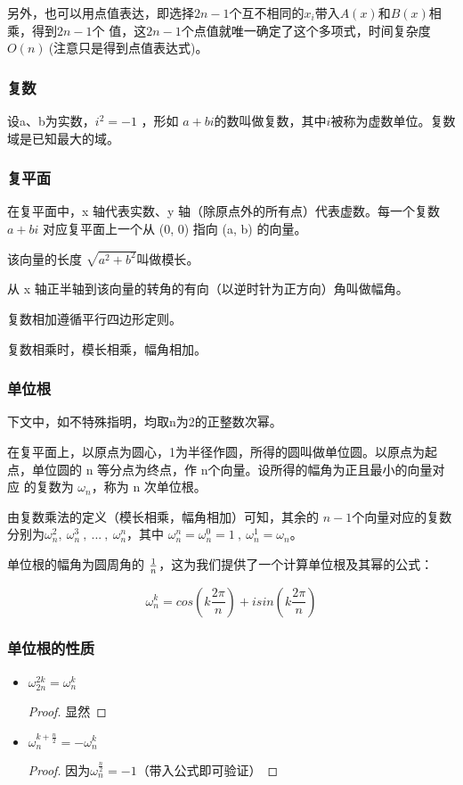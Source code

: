 \begin{note}
另外，也可以用点值表达，即选择$2n-1$个互不相同的$x_i$带入$A(x)$和$B(x)$相乘，得到$2n-1$个
值，这$2n-1$个点值就唯一确定了这个多项式，时间复杂度$O(n)\ $({\heiti 注意只是得到点值表达式})。
\end{note}

\subsubsection{复数}
设a、b为实数，$i ^ 2=-1$ ，形如 $a + bi$的数叫做复数，其中$i$被称为虚数单位。复数域是已知最大的域。


\subsubsection{复平面}
在复平面中，x 轴代表实数、y 轴（除原点外的所有点）代表虚数。每一个复数 $a + bi$ 对应复平面上一个从 (0, 0) 指向 (a, b) 的向量。

该向量的长度 $\sqrt {a ^ 2 + b ^ 2}$叫做{\heiti 模长}。

从 x 轴正半轴到该向量的转角的有向（以逆时针为正方向）角叫做{\heiti 幅角}。

复数相加遵循平行四边形定则。

复数相乘时，模长相乘，幅角相加。

\subsubsection{单位根}
下文中，如不特殊指明，均取{\heiti n为2的正整数次幂}。

在复平面上，以原点为圆心，1为半径作圆，所得的圆叫做{\heiti 单位圆}。以原点为起点，单位圆的 n 等分点为终点，作 n个向量。设所得的{\heiti 幅角为正且最小}的向量对应
的复数为 $\omega_n$，称为 n 次单位根。

由复数乘法的定义（模长相乘，幅角相加）可知，其余的 $n - 1$个向量对应的复数分别为$\omega_n^2,\ \omega_n^3\ ,\ ...\ ,\ \omega_n^n$，其中 
$\omega_n ^ n = \omega_n ^ 0 = 1\ ,\ \omega_n^1=\omega_n$。

单位根的幅角为圆周角的 $1 \over n$，这为我们提供了一个计算单位根及其幂的公式：

$$
\omega_n^k=cos(k\frac{2\pi}{n})+isin(k\frac{2\pi}{n})
$$

\subsubsection{单位根的性质}
\begin{itemize}
\item  $\omega_{2n}^{2k}=\omega_n^k$   
\begin{proof}
显然
\end{proof}

\vbox{}

\item  $\omega_n^{k+\frac{n}{2}}=-\omega_n^{k}$
\begin{proof}
  因为$\omega_n^{\frac{n}{2}}=-1$（带入公式即可验证）
\end{proof}
\end{itemize}

